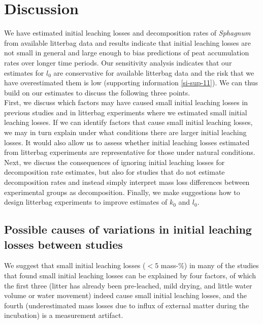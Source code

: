 \documentclass[bg, manuscript]{copernicus}
\begin{document}
\section{Discussion}

We have estimated initial leaching losses and decomposition rates of \emph{Sphagnum} from available litterbag data and results indicate that initial leaching losses are not small in general and large enough to bias predictions of peat accumulation rates over longer time periods. Our sensitivity analysis indicates that our estimates for \(l_0\) are conservative for available litterbag data and the risk that we have overestimated them is low (supporting information \ref{si-sup-11}). We can thus build on our estimates to discuss the following three points.\\
First, we discuss which factors may have caused small initial leaching losses in previous studies and in litterbag experiments where we estimated small initial leaching losses. If we can identify factors that cause small initial leaching losses, we may in turn explain under what conditions there are larger initial leaching losses. It would also allow us to assess whether initial leaching losses estimated from litterbag experiments are representative for those under natural conditions. Next, we discuss the consequences of ignoring initial leaching losses for decomposition rate estimates, but also for studies that do not estimate decomposition rates and instead simply interpret mass loss differences between experimental groups as decomposition. Finally, we make suggestions how to design litterbag experiments to improve estimates of \(k_0\) and \(l_0\).

\hypertarget{out-discussion-2}{%
\subsection{Possible causes of variations in initial leaching losses between studies}\label{out-discussion-2}}

We suggest that small initial leaching losses (\(<5\) mass-\%) in many of the studies that found small initial leaching losses can be explained by four factors, of which the first three (litter has already been pre-leached, mild drying, and little water volume or water movement) indeed cause small initial leaching losses, and the fourth (underestimated mass losses due to influx of external matter during the incubation) is a measurement artifact.
\end{document}
